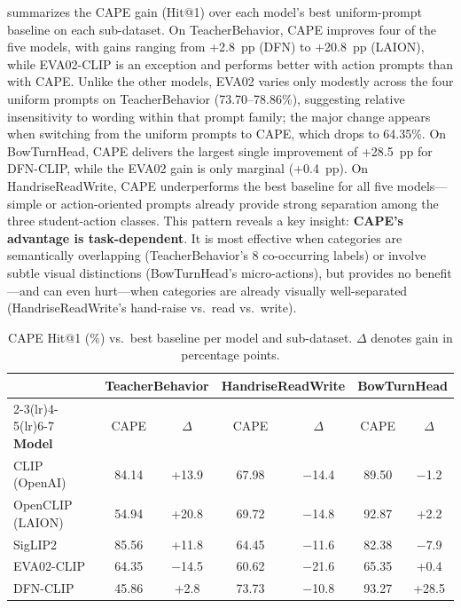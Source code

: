 \documentclass[electronics,article,submit,pdftex,moreauthors]{Definitions/mdpi}
\begin{document}
 summarizes the CAPE gain (Hit@1) over each model's best uniform-prompt baseline on each sub-dataset.
On TeacherBehavior, CAPE improves four of the five models, with gains ranging from +2.8~pp (DFN) to +20.8~pp (LAION), while EVA02-CLIP is an exception and performs better with action prompts than with CAPE. Unlike the other models, EVA02 varies only modestly across the four uniform prompts on TeacherBehavior (73.70--78.86\%), suggesting relative insensitivity to wording within that prompt family; the major change appears when switching from the uniform prompts to CAPE, which drops to 64.35\%.
On BowTurnHead, CAPE delivers the largest single improvement of +28.5~pp for DFN-CLIP, while the EVA02 gain is only marginal (+0.4~pp).
On HandriseReadWrite, CAPE underperforms the best baseline for all five models---simple or action-oriented prompts already provide strong separation among the three student-action classes.
This pattern reveals a key insight: \textbf{CAPE's advantage is task-dependent}. It is most effective when categories are semantically overlapping (TeacherBehavior's 8 co-occurring labels) or involve subtle visual distinctions (BowTurnHead's micro-actions), but provides no benefit---and can even hurt---when categories are already visually well-separated (HandriseReadWrite's hand-raise vs.\ read vs.\ write).

\begin{table}[H]
\caption{CAPE Hit@1 (\%) vs.\ best baseline per model and sub-dataset. $\Delta$ denotes gain in percentage points.}
\label{tab:cape_gain}
\centering
\small
\setlength{\tabcolsep}{3pt}
\begin{tabular}{l cc cc cc}
\toprule
 & \multicolumn{2}{c}{\textbf{TeacherBehavior}} & \multicolumn{2}{c}{\textbf{HandriseReadWrite}} & \multicolumn{2}{c}{\textbf{BowTurnHead}} \\
\cmidrule(lr){2-3}\cmidrule(lr){4-5}\cmidrule(lr){6-7}
\textbf{Model} & CAPE & $\Delta$ & CAPE & $\Delta$ & CAPE & $\Delta$ \\
\midrule
CLIP (OpenAI) & 84.14 & +13.9 & 67.98 & $-$14.4 & 89.50 & $-$1.2 \\
OpenCLIP (LAION) & 54.94 & +20.8 & 69.72 & $-$14.8 & 92.87 & +2.2 \\
SigLIP2 & 85.56 & +11.8 & 64.45 & $-$11.6 & 82.38 & $-$7.9 \\
EVA02-CLIP & 64.35 & $-$14.5 & 60.62 & $-$21.6 & 65.35 & +0.4 \\
DFN-CLIP & 45.86 & +2.8 & 73.73 & $-$10.8 & 93.27 & +28.5 \\
\bottomrule
\end{tabular}
\end{table}
\end{document}

